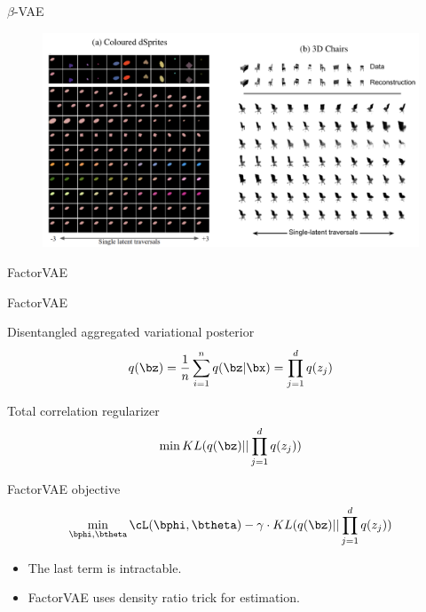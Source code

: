 \begin{frame}{$\beta$-VAE}
	\begin{figure}
		\centering
		\includegraphics[width=1.0\linewidth]{figs/betaVAE_9.png}
	\end{figure}
	
\end{frame}
\begin{frame}{FactorVAE}
\end{frame}
\begin{frame}{FactorVAE}
	\begin{block}{Disentangled aggregated variational posterior}
		\vspace{-0.3cm}
		\[
			q(\bz) = \frac{1}{n} \sum_{i=1}^n q(\bz | \bx) = \prod_{j=1}^d q(z_j)
		\]
		\vspace{-0.3cm}
	\end{block}
	\begin{block}{Total correlation regularizer}
		\vspace{-0.3cm}
		\[
		\min KL(q(\bz) || \prod_{j=1}^d q(z_j))
		\]
		\vspace{-0.3cm}
	\end{block}
	\begin{block}{FactorVAE objective}
		\vspace{-0.3cm}
		\[
		\min_{\bphi, \btheta} \cL(\bphi, \btheta) - \gamma \cdot KL(q(\bz) || \prod_{j=1}^d q(z_j))
		\]
		\vspace{-0.3cm}
	\end{block}
	\begin{itemize}
		\item The last term is intractable.
		\item FactorVAE uses density ratio trick for estimation. 
	\end{itemize}

\end{frame}
